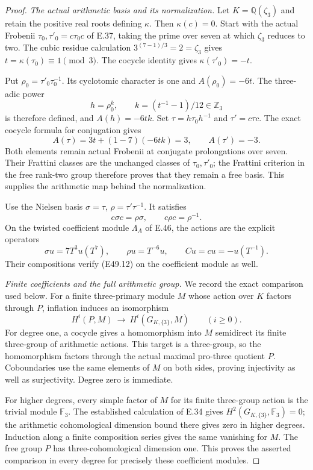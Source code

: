\begin{proof}
\emph{The actual arithmetic basis and its normalization.}
Let $K=\mathbb Q(\zeta_3)$ and retain the
positive real roots defining $\kappa$.
Then $\kappa(c)=0$. Start with the
actual Frobenii $\tau_0,\tau'_0=c\tau_0c$
of E.37, taking the prime over seven
at which $\zeta_3$ reduces to two.
The cubic residue calculation
$3^{(7-1)/3}=2=\zeta_3$ gives
$t=\kappa(\tau_0)\equiv1\pmod3$.
The cocycle identity gives
$\kappa(\tau'_0)=-t$.

Put $\rho_0=\tau'_0\tau_0^{-1}$.
Its cyclotomic character is one and
$A(\rho_0)=-6t$. The three-adic power
\[
        h=\rho_0^k,\qquad
             k=(t^{-1}-1)/12\in\mathbb Z_3
 \tag{E49.10}
\]
is therefore defined, and
$A(h)=-6tk$. Set
$\tau=h\tau_0h^{-1}$ and $\tau'=c\tau c$.
The exact cocycle formula for conjugation
gives
\[
 A(\tau)=3t+(1-7)(-6tk)=3,\qquad
                   A(\tau')=-3.
 \tag{E49.11}
\]
Both elements remain actual Frobenii at
conjugate prolongations over seven.
Their Frattini classes are the unchanged
classes of $\tau_0,\tau'_0$; the Frattini
criterion in the free rank-two group
therefore proves that they remain a
free basis. This supplies the arithmetic
map behind the normalization.

Use the Nielsen basis
$\sigma=\tau$, $\rho=\tau'\tau^{-1}$.
It satisfies
\[
 c\sigma c=\rho\sigma,\qquad c\rho c=\rho^{-1}.
 \tag{E49.12}
\]
On the twisted coefficient module
$\Lambda_A$ of E.46, the actions are
the explicit operators
\[
 \sigma u=7T^3u(T^7),\qquad
 \rho u=T^{-6}u,\qquad
 Cu=c u=-u(T^{-1}).
 \tag{E49.13}
\]
Their compositions verify (E49.12)
on the coefficient module as well.

\emph{Finite coefficients and the full arithmetic group.}
We record the exact comparison used below.
For a finite three-primary module $M$
whose action over $K$ factors through $P$,
inflation induces an isomorphism
\[
 H^i(P,M)\ \longrightarrow\
                  H^i(G_{K,\{3\}},M)
             \qquad(i\ge0).
 \tag{E49.14}
\]
For degree one, a cocycle gives a
homomorphism into $M$ semidirect its
finite three-group of arithmetic actions.
This target is a three-group, so the
homomorphism factors through the actual
maximal pro-three quotient $P$.
Coboundaries use the same elements of
$M$ on both sides, proving injectivity
as well as surjectivity. Degree zero
is immediate.

For higher degrees, every simple factor
of $M$ for its finite three-group action
is the trivial module $\mathbb F_3$.
The established calculation of E.34
gives $H^2(G_{K,\{3\}},\mathbb F_3)=0$;
the arithmetic cohomological dimension
bound there gives zero in higher degrees.
Induction along a finite composition
series gives the same vanishing for
$M$. The free group $P$ has
three-cohomological dimension one.
This proves the asserted comparison
in every degree for precisely these
coefficient modules.


\end{proof}
